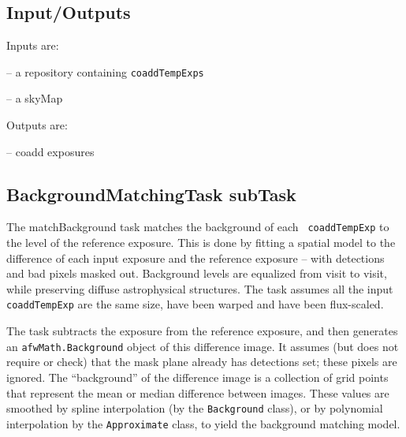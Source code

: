\documentclass[prd, nofootinbib, floatfix, 11pt,tightenlines,times]{article}
\begin{document}


\subsection{Input/Outputs}

Inputs are: 

-- a repository containing {\tt coaddTempExps}

-- a skyMap

Outputs are: 

-- coadd exposures

\subsection{BackgroundMatchingTask subTask} 
The matchBackground task matches the background of each {\tt
  coaddTempExp} to the level of the reference exposure.  This is done
by fitting a spatial model to the difference of each input exposure
and the reference exposure -- with detections and bad pixels masked
out.  Background levels are equalized from visit to visit, while
preserving diffuse astrophysical structures.  The task assumes all the
input {\tt coaddTempExp} are the same size, have been warped and have
been flux-scaled.

The task subtracts the exposure from the reference exposure, and then
generates an {\tt afwMath.Background} object of this difference image. It
assumes (but does not require or check) that the mask plane already
has detections set; these pixels are ignored.  The ``background'' of the
difference image is a collection of grid points that represent the
mean or median difference between images.  These values are smoothed
by spline interpolation (by the {\tt Background} class), or by polynomial
interpolation by the {\tt Approximate} class, to yield the background
matching model.

%
%
%
%
%
\end{document}
